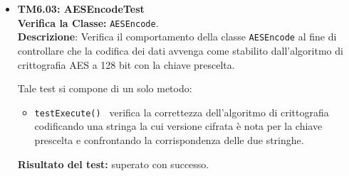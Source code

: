 \begin{itemize}
\item[\passed] \textbf{TM6.03: AESEncodeTest}\\
\textbf{Verifica la Classe:} \texttt{AESEncode}.\\
\textbf{Descrizione}: Verifica il comportamento della classe \texttt{AESEncode} al fine di controllare che la codifica dei dati avvenga come stabilito dall'algoritmo di crittografia AES a 128 bit con la chiave prescelta.

Tale test si compone di un solo metodo:
\begin{itemize}
\item \texttt{testExecute() } verifica la correttezza dell'algoritmo di crittografia codificando una stringa la cui versione cifrata è nota per la chiave prescelta e confrontando la corrispondenza delle due stringhe.
\end{itemize}
\textbf{Risultato del test:} superato con successo.

\end{itemize}


